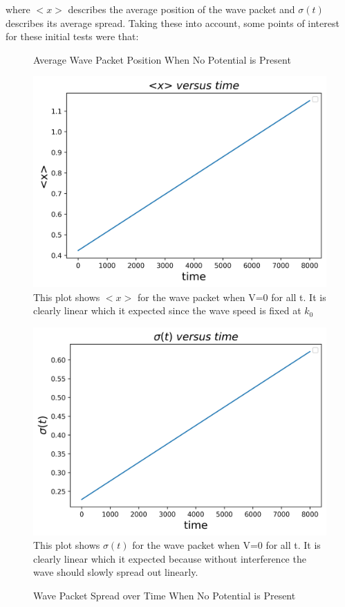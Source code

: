 \documentclass[twocolumn]{article}
\begin{document}
where $<x>$ describes the average position of the wave packet and $\sigma(t)$ describes its average spread. Taking these into account, some points of interest for these initial tests were that:
\begin{figure}[H]
\centering
\caption{Average Wave Packet Position When No Potential is Present}
\includegraphics[scale=.5]{X1}
\small{This plot shows $<x>$ for the wave packet when V=0 for all t. It is clearly linear which it expected since the wave speed is fixed at $k_0$}
\centering
\caption{Wave Packet Spread over Time When No Potential is Present}
\includegraphics[scale=.5]{sigma1}
\small{This plot shows $\sigma(t)$ for the wave packet when V=0 for all t. It is clearly linear which it expected because without interference the wave should slowly spread out linearly.}
\end{figure}
\end{document}
